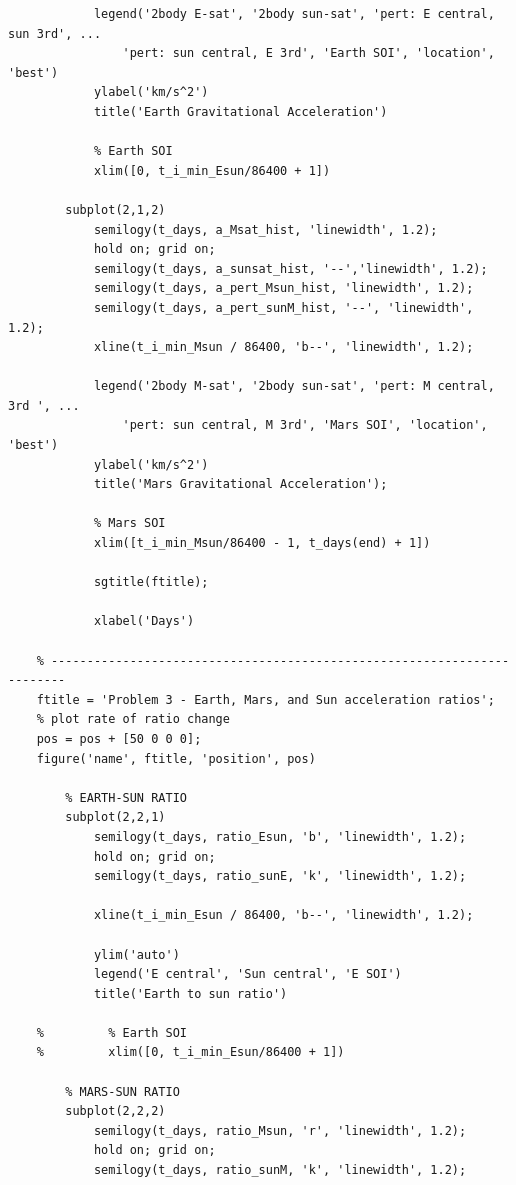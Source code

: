 \documentclass[conf]{new-aiaa}
\begin{document}
\begin{lstlisting}
            legend('2body E-sat', '2body sun-sat', 'pert: E central, sun 3rd', ... 
                'pert: sun central, E 3rd', 'Earth SOI', 'location', 'best')
            ylabel('km/s^2')
            title('Earth Gravitational Acceleration')
    
            % Earth SOI 
            xlim([0, t_i_min_Esun/86400 + 1])
            
        subplot(2,1,2) 
            semilogy(t_days, a_Msat_hist, 'linewidth', 1.2); 
            hold on; grid on; 
            semilogy(t_days, a_sunsat_hist, '--','linewidth', 1.2); 
            semilogy(t_days, a_pert_Msun_hist, 'linewidth', 1.2); 
            semilogy(t_days, a_pert_sunM_hist, '--', 'linewidth', 1.2); 
            xline(t_i_min_Msun / 86400, 'b--', 'linewidth', 1.2); 
            
            legend('2body M-sat', '2body sun-sat', 'pert: M central, 3rd ', ... 
                'pert: sun central, M 3rd', 'Mars SOI', 'location', 'best')
            ylabel('km/s^2')
            title('Mars Gravitational Acceleration'); 
            
            % Mars SOI 
            xlim([t_i_min_Msun/86400 - 1, t_days(end) + 1])
            
            sgtitle(ftitle); 
        
            xlabel('Days') 
    
    % ------------------------------------------------------------------------
    ftitle = 'Problem 3 - Earth, Mars, and Sun acceleration ratios'; 
    % plot rate of ratio change 
    pos = pos + [50 0 0 0]; 
    figure('name', ftitle, 'position', pos)
    
        % EARTH-SUN RATIO 
        subplot(2,2,1) 
            semilogy(t_days, ratio_Esun, 'b', 'linewidth', 1.2); 
            hold on; grid on; 
            semilogy(t_days, ratio_sunE, 'k', 'linewidth', 1.2); 
    
            xline(t_i_min_Esun / 86400, 'b--', 'linewidth', 1.2); 
            
            ylim('auto') 
            legend('E central', 'Sun central', 'E SOI')
            title('Earth to sun ratio') 
    
    %         % Earth SOI 
    %         xlim([0, t_i_min_Esun/86400 + 1])
    
        % MARS-SUN RATIO 
        subplot(2,2,2) 
            semilogy(t_days, ratio_Msun, 'r', 'linewidth', 1.2); 
            hold on; grid on; 
            semilogy(t_days, ratio_sunM, 'k', 'linewidth', 1.2); 
    

\end{lstlisting}
\end{document}
